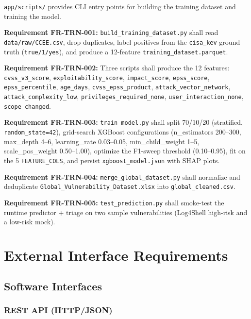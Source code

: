 \documentclass[10pt,journal,onecolumn]{IEEEtran}
\newcommand{\reqid}[1]{\textbf{#1}}
\begin{document}
\texttt{app/scripts/} provides CLI entry points for building the training dataset and training the model.

\reqid{Requirement FR-TRN-001:} \texttt{build\_\allowbreak training\_\allowbreak dataset.\allowbreak py} shall read \texttt{data/raw/CCEE.csv}, drop duplicates, label positives from the \texttt{cisa\_kev} ground truth (\texttt{true/1/yes}), and produce a 12-feature \texttt{training\_\allowbreak dataset.\allowbreak parquet}.

\reqid{Requirement FR-TRN-002:} Three scripts shall produce the 12 features: \texttt{cvss\_v3\_score}, \texttt{exploitability\_score}, \texttt{impact\_score}, \texttt{epss\_score}, \texttt{epss\_percentile}, \texttt{age\_days}, \texttt{cvss\_epss\_product}, \texttt{attack\_vector\_network}, \texttt{attack\_complexity\_low}, \texttt{privileges\_\allowbreak required\_\allowbreak none}, \texttt{user\_interaction\_none}, \texttt{scope\_changed}.

\reqid{Requirement FR-TRN-003:} \texttt{train\_model.py} shall split 70/10/20 (stratified, \texttt{random\_state=42}), grid-search XGBoost configurations (n\_estimators 200--300, max\_depth 4--6, learning\_rate 0.03--0.05, min\_child\_weight 1--5, scale\_pos\_weight 0.50--1.00), optimize the F1-sweep threshold (0.10--0.95), fit on the 5 \texttt{FEATURE\_COLS}, and persist \texttt{xgboost\_model.json} with SHAP plots.

\reqid{Requirement FR-TRN-004:} \texttt{merge\_\allowbreak global\_\allowbreak dataset.\allowbreak py} shall normalize and deduplicate \texttt{Global\_\allowbreak Vulnerability\_\allowbreak Dataset.\allowbreak xlsx} into \texttt{global\_cleaned.csv}.

\reqid{Requirement FR-TRN-005:} \texttt{test\_prediction.py} shall smoke-test the runtime predictor + triage on two sample vulnerabilities (Log4Shell high-risk and a low-risk mock).

\section{External Interface Requirements}

\subsection{Software Interfaces}

\subsubsection{REST API (HTTP/JSON)}
\end{document}

